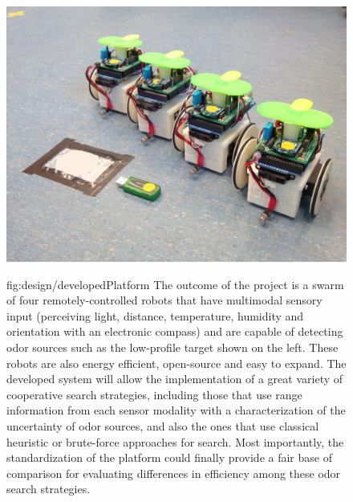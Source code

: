 \begin{figure}[h!]
\centerline{\mbox{\includegraphics[width=12.5cm]{images/design/developedPlatform.jpg}}}
{fig:design/developedPlatform}{
The outcome of the project is a swarm of four remotely-controlled robots that have multimodal sensory input (perceiving light, distance, temperature, humidity and orientation with an electronic compass) and are capable of detecting odor sources such as the low-profile target shown on the left.
These robots are also energy efficient, open-source and easy to expand.
The developed system will allow the implementation of a great variety of cooperative search strategies, including those that use range information from each sensor modality with a characterization of the uncertainty of odor sources, and also the ones that use classical heuristic or brute-force approaches for search. Most importantly, the standardization of the platform could finally provide a fair base of comparison for evaluating differences in efficiency among these odor search strategies.
}\end{figure}


\newpage \thispagestyle{empty} %

